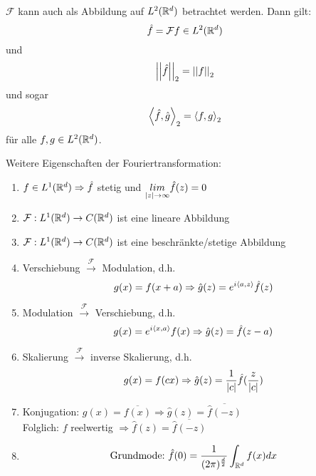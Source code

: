     $\mathcal F$ kann auch als Abbildung auf $L^2(\mathbb{R}^d)$ betrachtet werden. Dann gilt:\\
    \[\hat f = \mathcal F f \in L^2(\mathbb{R}^d)\]
    und
    \begin{equation}
        \left\lvert \left\lvert \hat f \right\rvert \right\rvert_2 = \left\lvert \left\lvert f \right\rvert \right\rvert_2
    \end{equation}
    und sogar
    \begin{equation}
        \left \langle \hat f,\hat g \right \rangle_2 = \left \langle f,g \right \rangle_2
    \end{equation}
    für alle $f,g \in L^2(\mathbb{R}^d)$.

    Weitere Eigenschaften der Fouriertransformation:

    \begin{enumerate}[-]
        \item $f \in L^1(\mathbb{R}^d) \Rightarrow \hat f$ stetig und $\underset{\left\lvert z \right\rvert \to \infty}{lim} \hat f(z) = 0$
        \item $\mathcal F: L^1(\mathbb{R}^d) \to C(\mathbb{R}^d)$ ist eine lineare Abbildung
        \item $\mathcal F: L^1(\mathbb{R}^d) \to C(\mathbb{R}^d)$ ist eine beschränkte/stetige Abbildung
        \item Verschiebung $\overset{\mathcal F}{\to}$ Modulation, d.h.
        \begin{equation*}
            g(x) = f(x+a) \Rightarrow \hat g(z) = e^{i \left \langle a,z \right \rangle} \hat f(z)
        \end{equation*}
        \item Modulation $\overset{\mathcal F}{\to}$ Verschiebung, d.h.
        \begin{equation*}
            g(x) = e^{i \left \langle x,a \right \rangle} f(x) \Rightarrow \hat g(z)= \hat f(z-a)
        \end{equation*}
        \item Skalierung $\overset{\mathcal F}{\to}$ inverse Skalierung, d.h.
        \begin{equation*}
            g(x)=f(cx) \Rightarrow \hat g(z) = \frac{1}{\left\lvert c \right\rvert} \hat f(\frac{z}{\left\lvert c \right\rvert})
        \end{equation*}
        \item Konjugation: $g(x) = \overline{f(x)} \Rightarrow \hat g(z) = \overline{\hat f (-z)}$\\
        Folglich: $f$ reelwertig $\Rightarrow \hat f(z) = \overline{\hat f(-z)}$
        \item
        \begin{align*}
            \text{Grundmode:} \ & \displaystyle \hat f(0) = \frac{1}{(2 \pi )^\frac{d}{2}} \int_{\R^d} f(x) dx\\

\end{align*}
\end{enumerate}
